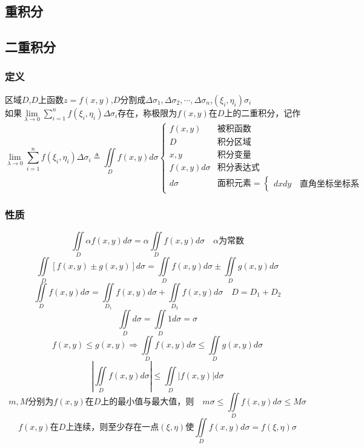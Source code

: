 \begin{center}\section{重积分}\label{chapter_multiple_integral}\end{center}
\subsection{二重积分}
\subsubsection{定义}
区域$D$,$D$上函数$z=f(x,y)$,$D$分割成$\Delta \sigma_1,\Delta \sigma_2,\cdots,\Delta \sigma_n$,$(\xi_i,\eta_i)\sigma_i$\\
如果$\lim\limits_{\lambda\to 0}\sum\limits_{i=1}^{n}f(\xi_i,\eta_i)\Delta\sigma_i$存在，称极限为$f(x,y)$在$D$上的二重积分，记作
$$\lim\limits_{\lambda\to 0}\sum_{i=1}^{n}f(\xi_i,\eta_i)\Delta\sigma_i\triangleq\iint\limits_{D}f(x,y)d\sigma\begin{cases}
	f(x,y)\quad &\mbox{被积函数}\\
	D&\mbox{积分区域}\\
	x,y&\mbox{积分变量}\\
	f(x,y)d\sigma &\mbox{积分表达式}\\
	d\sigma&\mbox{面积元素}=\begin{cases}
		dxdy \quad\mbox{直角坐标坐标系}
	\end{cases}
\end{cases}$$
\subsubsection{性质}
	$$\iint\limits_{D}\alpha f(x,y)d\sigma=\alpha\iint\limits_{D} f(x,y)d\sigma \quad\alpha\mbox{为常数}$$
	$$\iint\limits_{D} [f(x,y)\pm g(x,y)]d\sigma=\iint\limits_{D}f(x,y)d\sigma\pm\iint\limits_{D}g(x,y)d\sigma$$
	$$\iint\limits_{D}f(x,y)d\sigma=\iint\limits_{D_1}f(x,y)d\sigma+\iint\limits_{D_2}f(x,y)d\sigma \quad D=D_1+D_2$$
	$$\iint\limits_{D}d\sigma=\iint\limits_{D}1d\sigma=\sigma$$
	$$f(x,y)\leqslant g(x,y)\Rightarrow \iint\limits_{D}f(x,y)d\sigma\leqslant\iint\limits_{D}g(x,y)d\sigma$$
	$$\left|\iint\limits_{D}f(x,y)d\sigma\right|\leqslant\iint\limits_{D}|f(x,y)|d\sigma$$
	$$m,M\mbox{分别为}f(x,y)\mbox{在}D\mbox{上的最小值与最大值，则}\quad m\sigma\leqslant\iint\limits_{D}f(x,y)d\sigma\leqslant M\sigma$$
	$$f(x,y)\mbox{在}D\mbox{上连续，则至少存在一点}(\xi,\eta)\mbox{使}\iint\limits_{D}f(x,y)d\sigma=f(\xi,\eta)\sigma$$
